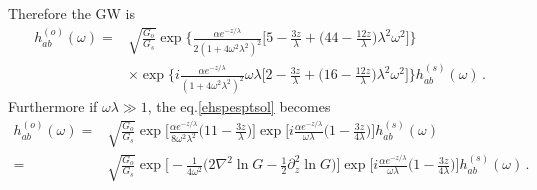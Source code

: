 \documentclass[
 jor,
 amsmath,amssymb,preprint,
]{revtex4-2}
\begin{document}
Therefore the GW is
\begin{equation}
\begin{aligned}
h^{(o)}_{ab}(\omega) = &  \sqrt{\frac{G_o}{G_s}} \exp\bigg\{ \frac{\alpha e^{-z/\lambda}}{2(1+4\omega^2\lambda^2)^2} \bigg[ 5 - \frac{3z}{\lambda} + \bigg(44 - \frac{12z}{\lambda}\bigg) \lambda^2\omega^2 \bigg] \bigg\} \\
& \times \exp\bigg\{ i \frac{\alpha e^{-z/\lambda}}{(1+4\omega^2\lambda^2)^2}\omega\lambda \bigg[ 2 -\frac{3z}{\lambda} + \bigg(16 - \frac{12z}{\lambda} \bigg) \lambda^2\omega^2 \bigg] \bigg\} h^{(s)}_{ab}(\omega) \,. \label{ehspesptsol}
\end{aligned}
\end{equation}
Furthermore if $\omega \lambda \gg 1$, the eq.\eqref{ehspesptsol} becomes
\begin{equation}
\begin{aligned}
h^{(o)}_{ab}(\omega) = & \sqrt{\frac{G_o}{G_s}} \exp\bigg[ \frac{\alpha e^{-z/\lambda}}{8\omega^2\lambda^2} \bigg(11 - \frac{3z}{\lambda}\bigg)  \bigg] \exp\bigg[ i \frac{\alpha e^{-z/\lambda}}{\omega\lambda} \bigg(1 - \frac{3z}{4\lambda} \bigg) \bigg] h_{ab}^{(s)}(\omega) \\
= & \sqrt{\frac{G_o}{G_s}} \exp\bigg[ -\frac{1}{4\omega^2} \bigg(2\nabla^2\ln G - \frac{1}{2}\partial_z^2\ln G\bigg)  \bigg] \exp\bigg[ i \frac{\alpha e^{-z/\lambda}}{\omega\lambda} \bigg(1 - \frac{3z}{4\lambda} \bigg) \bigg] h_{ab}^{(s)}(\omega) \,.
\end{aligned}
\end{equation}
\end{document}
